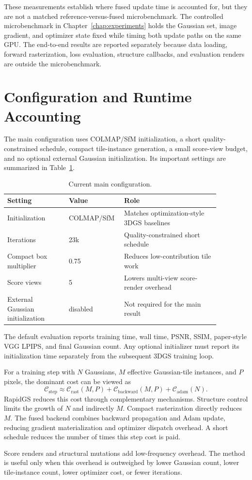 These measurements establish where fused update time is accounted for, but they are not a matched reference-versus-fused microbenchmark. The controlled microbenchmark in Chapter~\ref{chap:experiments} holds the Gaussian set, image gradient, and optimizer state fixed while timing both update paths on the same GPU. The end-to-end results are reported separately because data loading, forward rasterization, loss evaluation, structure callbacks, and evaluation renders are outside the microbenchmark.

\section{Configuration and Runtime Accounting}

The main configuration uses COLMAP/SfM initialization, a short quality-constrained schedule, compact tile-instance generation, a small score-view budget, and no optional external Gaussian initialization. Its important settings are summarized in Table~\ref{tab:main-config}.

\begin{table}[H]
\centering
\caption{Current main configuration.}
\label{tab:main-config}
\begin{tabular}{p{0.27\linewidth}p{0.18\linewidth}p{0.42\linewidth}}
\toprule
Setting & Value & Role \\
\midrule
Initialization & COLMAP/SfM & Matches optimization-style 3DGS baselines \\
Iterations & 23k & Quality-constrained short schedule \\
Compact box multiplier & 0.75 & Reduces low-contribution tile work \\
Score views & 5 & Lowers multi-view score-render overhead \\
External Gaussian initialization & disabled & Not required for the main result \\
\bottomrule
\end{tabular}
\end{table}

The default evaluation reports training time, wall time, PSNR, SSIM, paper-style VGG LPIPS, and final Gaussian count. Any optional initializer must report its initialization time separately from the subsequent 3DGS training loop.

For a training step with $N$ Gaussians, $M$ effective Gaussian-tile instances, and $P$ pixels, the dominant cost can be viewed as
\begin{equation}
\mathcal{C}_{\mathrm{step}}
\approx
\mathcal{C}_{\mathrm{rast}}(M,P)
+
\mathcal{C}_{\mathrm{backward}}(M,P)
+
\mathcal{C}_{\mathrm{adam}}(N).
\end{equation}
RapidGS reduces this cost through complementary mechanisms. Structure control limits the growth of $N$ and indirectly $M$. Compact rasterization directly reduces $M$. The fused backend combines backward propagation and Adam update, reducing gradient materialization and optimizer dispatch overhead. A short schedule reduces the number of times this step cost is paid.

Score renders and structural mutations add low-frequency overhead. The method is useful only when this overhead is outweighed by lower Gaussian count, lower tile-instance count, lower optimizer cost, or fewer iterations.
